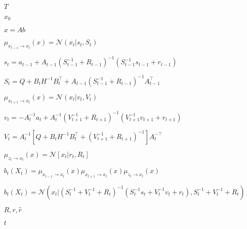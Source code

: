 \documentclass{article}
\begin{document}
$T$
\pagebreak

$x_0$
\pagebreak

$x=Ab$
\pagebreak

$ \mu_{x_{t-1}\rightarrow x_t}(x)=\mathcal{N}(x_t|s_t,S_t) $
\pagebreak

$ s_t=a_{t-1}\!+\!A_{t-1}(S_{t-1}^{-1}\!+\!R_{t-1})^{-1}(S_{t-1}^{-1}s_{t-1}\!+\!r_{t-1}) $
\pagebreak

$ S_t=Q+B_tH^{-1}B_t^{\!\top\!} + A_{t-1}(S_{t-1}^{-1}+R_{t-1})^{-1}A_{t-1}^{\!\top\!} $
\pagebreak

$ \mu_{x_{t+1}\rightarrow x_t}(x)=\mathcal{N}(x_t|v_t,V_t) $
\pagebreak

$ v_t=-A_{t}^{-1}a_{t}\!\!+\!\!A_{t}^{-1}(V_{t+1}^{-1}\!\!+\!\!R_{t+1})^{-1}(V_{t+1}^{-1}v_{t+1}\!\!+\!\!r_{t+1}) $
\pagebreak

$ V_t=A_{t}^{-1}[Q+B_tH^{-1}B_t^{\!\top\!} + (V_{t+1}^{-1}+R_{t+1})^{-1}]A_{t}^{-{\!\top\!}} $
\pagebreak

$ \mu_{z_t\rightarrow x_t}(x)=\mathcal{N}[x_t|r_t,R_t] $
\pagebreak

$ b_t(X_t)=\mu_{x_{t-1}\rightarrow x_t}(x) \mu_{x_{t+1}\rightarrow x_t}(x) \mu_{z_t\rightarrow x_t}(x) $
\pagebreak

$ b_t(X_t)=\mathcal{N}\left(x_t|(S_t^{-1}+V_t^{-1}+R_t)^{-1}(S_t^{-1}s_t+V_t^{-1}v_t+r_t),S_t^{-1}+V_t^{-1}+R_t \right) $
\pagebreak

$ R, r, \hat{r} $
\pagebreak

$t$
\pagebreak
\end{document}
